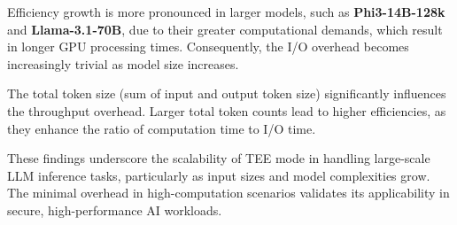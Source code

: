 \documentclass{article}
\begin{document}
Efficiency growth is more pronounced in larger models, such as \textbf{Phi3-14B-128k} and \textbf{Llama-3.1-70B}, due to their greater computational demands, which result in longer GPU processing times. Consequently, the I/O overhead becomes increasingly trivial as model size increases.

The total token size (sum of input and output token size) significantly influences the throughput overhead. Larger total token counts lead to higher efficiencies, as they enhance the ratio of computation time to I/O time.

These findings underscore the scalability of TEE mode in handling large-scale LLM inference tasks, particularly as input sizes and model complexities grow. The minimal overhead in high-computation scenarios validates its applicability in secure, high-performance AI workloads.




\end{document}
